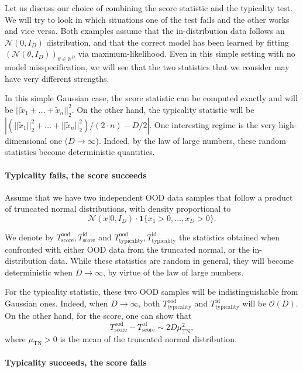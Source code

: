 {Let us discuss our choice of combining the score statistic and the typicality test. We will try to look in which situations one of the test fails and the other works and vice versa. Both examples assume that the in-distribution data follows an $\mathcal{N}(0,I_D)$ distribution, and that the correct model has been learned by fitting $(\mathcal{N}(\theta,I_D))_{\theta \in \mathbb{R}^D}$ via maximum-likelihood. Even in this simple setting with no model misspecification, we will see that the two statistics that we consider may have very different strengths.

In this simple Gaussian case, the score statistic can be computed exactly and will be $||\tilde{x}_1 + \ldots + \tilde{x}_n ||_2^2 $. On the other hand, the typicality statistic will be $| (||\tilde{x}_1||_2^2 + \ldots + ||\tilde{x}_n||_2^2)/(2\cdot n) -  D/ 2| $. One interesting regime is the very high-dimensional one ($D \to \infty$). Indeed, by the law of large numbers, these random statistics become deterministic quantities.


\paragraph{Typicality fails, the score succeeds}

Assume that we have two independent OOD data samples that follow a product of truncated normal distributions, with density proportional to $$\mathcal{N}(x | 0,I_D) \cdot  \mathbf{1}\{x_1>0,\ldots,x_D>0\}.$$

We denote by $T_\text{score}^\text{ood},T_\text{score}^\text{id}$ and $T_\text{typicality}^\text{ood},T_\text{typicality}^\text{id}$ the statistics obtained when confronted with either OOD data from the truncated normal, or the in-distribution data. While these statistics are random in general, they will become deterministic when $D \to \infty$, by virtue of the law of large numbers.

For the typicality statistic, these two OOD samples will be indistinguishable from Gaussian ones. Indeed, when $D \to \infty$, both $T_\text{typicality}^\text{ood}$ and $T_\text{typicality}^\text{id}$ will be $\mathcal{O}(D)$.
%
On the other hand, for the score, one can show that
\begin{equation}
T_\text{score}^\text{ood} - T_\text{score}^\text{id} \sim 2 D \mu_\text{TN}^2,
\end{equation}
where $\mu_\text{TN}>0$ is the mean of the truncated normal distribution.


\paragraph{Typicality succeeds, the score fails}

}
